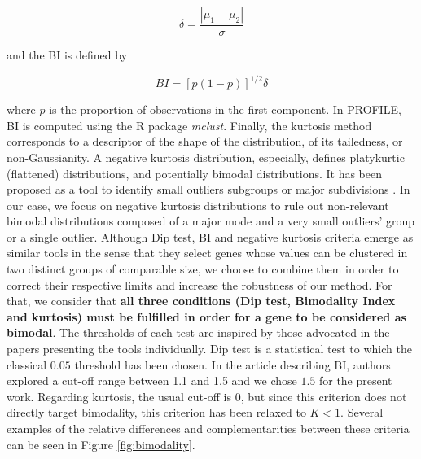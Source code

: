 \documentclass[a4paper,12pt,twoside,onecolumn,openright,final,oldfontcommands]{memoir}
\begin{document}
\[\delta = \dfrac{|\mu_1-\mu_2|}{\sigma}\]

and the BI is defined by

\[BI=[p(1-p)]^{1/2}\delta\]

where \(p\) is the proportion of observations in the first component. In
PROFILE, BI is computed using the R package \emph{mclust}. Finally, the
kurtosis method corresponds to a descriptor of the shape of the
distribution, of its tailedness, or non-Gaussianity. A negative kurtosis
distribution, especially, defines platykurtic (flattened) distributions,
and potentially bimodal distributions. It has been proposed as a tool to
identify small outliers subgroups or major subdivisions
\citep{teschendorff2006pack}. In our case, we focus on negative kurtosis
distributions to rule out non-relevant bimodal distributions composed of
a major mode and a very small outliers' group or a single outlier.
Although Dip test, BI and negative kurtosis criteria emerge as similar
tools in the sense that they select genes whose values can be clustered
in two distinct groups of comparable size, we choose to combine them in
order to correct their respective limits and increase the robustness of
our method. For that, we consider that \textbf{all three conditions (Dip
test, Bimodality Index and kurtosis) must be fulfilled in order for a
gene to be considered as bimodal}. The thresholds of each test are
inspired by those advocated in the papers presenting the tools
individually. Dip test is a statistical test to which the classical
\(0.05\) threshold has been chosen. In the article describing BI,
authors explored a cut-off range between 1.1 and 1.5 and we chose
\(1.5\) for the present work. Regarding kurtosis, the usual cut-off is
\(0\), but since this criterion does not directly target bimodality,
this criterion has been relaxed to \(K < 1\). Several examples of the
relative differences and complementarities between these criteria can be
seen in Figure \ref{fig:bimodality}.
\end{document}
